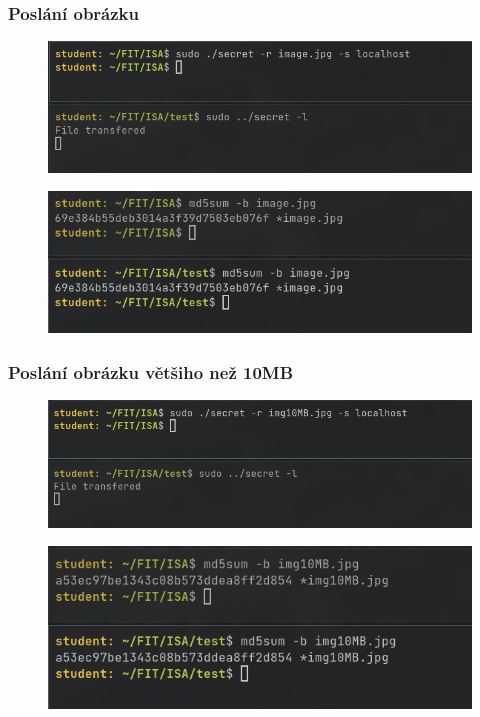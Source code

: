 \documentclass[11pt, a4paper]{article}
\begin{document}
\begin{flushleft}
\subsubsection{Poslání obrázku}

 \begin{figure}[H]
    \centering
    \includegraphics[scale=0.65, keepaspectratio]{img/send_img.png}
    \label{fig:txt}
 \end{figure}
 
  \begin{figure}[H]
    \centering
    \includegraphics[scale=0.72, keepaspectratio]{img/cmp_img.png}
    \label{fig:txt}
 \end{figure}

\subsubsection{Poslání obrázku většiho než 10MB}

 \begin{figure}[H]
    \centering
    \includegraphics[scale=0.62, keepaspectratio]{img/send_10mb.png}
    \label{fig:txt}
 \end{figure}
 
  \begin{figure}[H]
    \centering
    \includegraphics[scale=0.79, keepaspectratio]{img/cmp_10.png}
    \label{fig:txt}
 \end{figure}


\end{flushleft}
\end{document}
